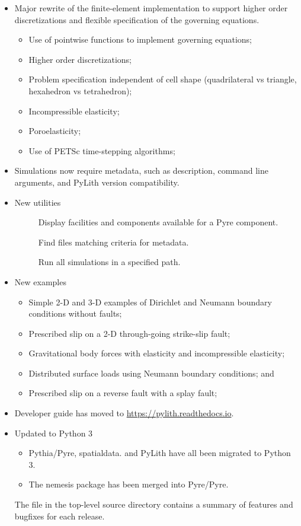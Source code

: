 \begin{itemize}
\item Major rewrite of the finite-element implementation to support
  higher order discretizations and flexible specification of the
  governing equations.
  \begin{itemize}
  \item Use of pointwise functions to implement governing equations;
  \item Higher order discretizations;
  \item Problem specification independent of cell shape (quadrilateral
    vs triangle, hexahedron vs tetrahedron);
  \item Incompressible elasticity;
  \item Poroelasticity;
  \item Use of PETSc time-stepping algorithms;
  \end{itemize}
\item Simulations now require metadata, such as description, command
  line arguments, and PyLith version compatibility.
\item New utilities
  \begin{description}
  \item[] Display facilities and components
    available for a Pyre component.
   \item[] Find  files matching
     criteria for metadata.
   \item[] Run all simulations in a specified path.
  \end{description}
\item New examples
  \begin{itemize}
  \item Simple 2-D and 3-D examples of Dirichlet and Neumann boundary
    conditions without faults;
  \item Prescribed slip on a 2-D through-going strike-slip fault;
  \item Gravitational body forces with elasticity and incompressible
    elasticity;
  \item Distributed surface loads using Neumann boundary conditions;
    and
  \item Prescribed slip on a reverse fault with a splay fault;
  \end{itemize}
\item Developer guide has moved to \url{https://pylith.readthedocs.io}.
\item Updated to Python 3
  \begin{itemize}
  \item Pythia/Pyre, spatialdata. and PyLith have all been migrated to
    Python 3.
  \item The nemesis package has been merged into Pyre/Pyre.
\end{itemize}
The  file in the top-level source directory contains
a summary of features and bugfixes for each release.



\end{itemize}
